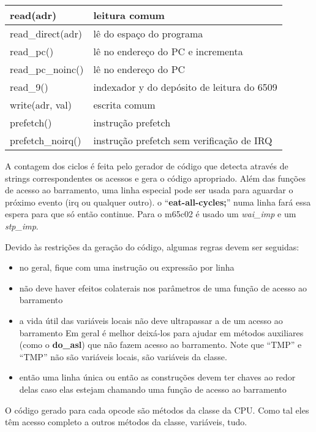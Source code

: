 \documentclass[letterpaper,10pt,brazil]{sphinxmanual}
\begin{document}
\noindent\begin{tabulary}{\linewidth}{|L|L|}
\hline

read(adr)
&
leitura comum
\\
\hline
read\_direct(adr)
&
lê do espaço do programa
\\
\hline
read\_pc()
&
lê no endereço do PC e incrementa
\\
\hline
read\_pc\_noinc()
&
lê no endereço do PC
\\
\hline
read\_9()
&
indexador y do depósito de leitura do 6509
\\
\hline
write(adr, val)
&
escrita comum
\\
\hline
prefetch()
&
instrução prefetch
\\
\hline
prefetch\_noirq()
&
instrução prefetch sem verificação de IRQ
\\
\hline\end{tabulary}


A contagem dos ciclos é feita pelo gerador de código que detecta através
de strings correspondentes os acessos e gera o código apropriado.
Além das funções de acesso ao barramento, uma linha especial pode ser
usada para aguardar o próximo evento (irq ou qualquer outro). o
``\textbf{eat-all-cycles;}'' numa linha fará essa espera para que só então
continue. Para o m65c02 é usado um \emph{wai\_imp} e um \emph{stp\_imp}.

Devido às restrições da geração do código, algumas regras devem ser
seguidas:
\begin{itemize}
\item {} 
no geral, fique com uma instrução ou expressão por linha

\item {} 
não deve haver efeitos colaterais nos parâmetros de uma função de
acesso ao barramento

\item {} 
a vida útil das variáveis locais não deve ultrapassar a de um acesso
ao barramento Em geral é melhor deixá-los para ajudar em métodos
auxiliares (como o \textbf{do\_asl}) que não fazem acesso ao barramento.
Note que ``TMP'' e ``TMP'' não são variáveis locais, são variáveis da
classe.

\item {} 
então uma linha única ou então as construções devem ter chaves ao
redor delas caso elas estejam chamando uma função de acesso ao
barramento

\end{itemize}

O código gerado para cada opcode são métodos da classe da CPU. Como tal
eles têm acesso completo a outros métodos da classe, variáveis, tudo.
\end{document}
